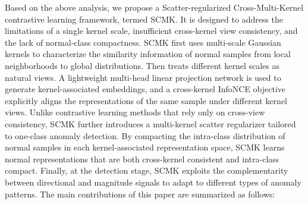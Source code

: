 \documentclass[times, review, 10pt]{elsarticle}
\begin{document}
Based on the above analysis, we propose a Scatter-regularized Cross-Multi-Kernel contrastive learning framework, termed SCMK. It is 
designed to address the limitations of a single kernel scale, insufficient cross-kernel view consistency, and the lack of 
normal-class compactness. SCMK first uses multi-scale Gaussian kernels to characterize the similarity information of normal samples 
from local neighborhoods to global distributions. Then treats different kernel scales as natural views. A lightweight multi-head 
linear projection network is used to generate kernel-associated embeddings, and a cross-kernel InfoNCE objective explicitly aligns 
the representations of the same sample under different kernel views. Unlike contrastive learning methods that rely only on cross-view 
consistency, SCMK further introduces a multi-kernel scatter regularizer tailored to one-class anomaly detection. By compacting the 
intra-class distribution of normal samples in each kernel-associated representation space, SCMK learns normal representations that 
are both cross-kernel consistent and intra-class compact. Finally, at the detection stage, SCMK exploits the complementarity between 
directional and magnitude signals to adapt to different types of anomaly patterns. The main contributions of this paper are summarized 
as follows:
\end{document}
